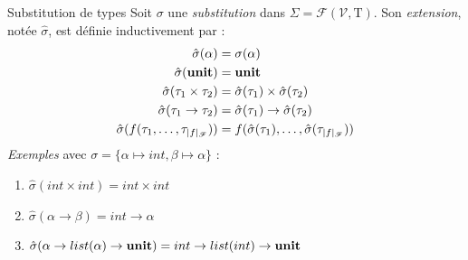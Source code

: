 \documentclass[serif]{beamer}
\newcommand{\exemples}{\textit{Exemples}\xspace}
\newcommand{\unit}{\bold{unit}}
\newcommand{\V}{\mathscr{V}}
\newcommand{\F}{\mathscr{F}}
\newcommand{\T}{\mathrm{T}}
\begin{document}

\begin{frame}{Substitution de types}
\small
Soit $\sigma$ une \emph{substitution} dans $\Sigma = \mathscr{F} (\V, \T)$. Son \emph{extension}, notée $\hat\sigma$, est définie inductivement par :
\begin{align*}
		\hat\sigma (\alpha) &=
		\sigma (\alpha)
	\\
		\hat\sigma (\unit) &=
		\unit
	\\
		\hat\sigma (\tau_1 \times \tau_2) &=
		\hat\sigma (\tau_1) \times \hat\sigma (\tau_2)
	\\
		\hat\sigma (\tau_1 \rightarrow \tau_2) &=
		\hat\sigma (\tau_1) \rightarrow \hat\sigma (\tau_2)
	\\
		\hat\sigma (f (\tau_1, \dots, \tau_{|f|_\F})) &=
		f (\hat\sigma (\tau_1), \dots, \hat\sigma (\tau_{|f|_\F}))
\end{align*}
\exemples avec $\sigma = \{ \alpha \mapsto int, \beta \mapsto \alpha \}$ :
\begin{enumerate}
	\item $\hat\sigma (int \times int) = int \times int$
	\item $\hat\sigma (\alpha \rightarrow \beta) = int \rightarrow \alpha$
	\item $\hat\sigma (\alpha \rightarrow list (\alpha) \rightarrow \unit) = int \rightarrow list (int) \rightarrow \unit$
\end{enumerate}
\end{frame}

\end{document}
